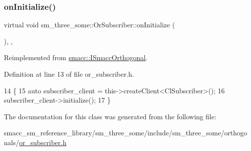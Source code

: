 \subsubsection{\texorpdfstring{on\+Initialize()}{onInitialize()}}
{\footnotesize\ttfamily virtual void sm\+\_\+three\+\_\+some\+::\+Or\+Subscriber\+::on\+Initialize (\begin{DoxyParamCaption}{ }\end{DoxyParamCaption})\hspace{0.3cm}{\ttfamily [inline]}, {\ttfamily [override]}, {\ttfamily [virtual]}}



Reimplemented from \hyperlink{classsmacc_1_1ISmaccOrthogonal_a6bb31c620cb64dd7b8417f8705c79c7a}{smacc\+::\+I\+Smacc\+Orthogonal}.



Definition at line 13 of file or\+\_\+subscriber.\+h.


\begin{DoxyCode}
14     \{
15         \textcolor{keyword}{auto} subscriber\_client = this->createClient<ClSubscriber>();
16         subscriber\_client->initialize();
17     \}
\end{DoxyCode}


The documentation for this class was generated from the following file\+:\begin{DoxyCompactItemize}
\item 
smacc\+\_\+sm\+\_\+reference\+\_\+library/sm\+\_\+three\+\_\+some/include/sm\+\_\+three\+\_\+some/orthogonals/\hyperlink{sm__three__some_2include_2sm__three__some_2orthogonals_2or__subscriber_8h}{or\+\_\+subscriber.\+h}\end{DoxyCompactItemize}
